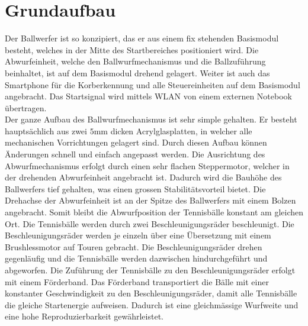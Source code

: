 \section{Grundaufbau}
    Der Ballwerfer ist so konzipiert, das er aus einem fix stehenden Basismodul besteht, 
    welches in der Mitte des Startbereiches positioniert wird. Die Abwurfeinheit, welche 
    den Ballwurfmechanismus und die Ballzuführung beinhaltet, ist auf dem Basismodul 
    drehend gelagert. Weiter ist auch das Smartphone für die Korberkennung und alle 
    Steuereinheiten auf dem Basismodul angebracht. Das Startsignal wird mittels WLAN 
    von einem externen Notebook übertragen.\\
    Der ganze Aufbau des Ballwurfmechanismus ist sehr simple gehalten. Er besteht 
    hauptsächlich aus zwei $5\si{\milli\meter}$ dicken Acrylglasplatten, in welcher alle mechanischen 
    Vorrichtungen gelagert sind. Durch diesen Aufbau können Änderungen schnell und 
    einfach angepasst werden. Die Ausrichtung des Abwurfmechanismus erfolgt durch 
    einen sehr flachen Steppermotor, welcher in der drehenden Abwurfeinheit angebracht 
    ist. Dadurch wird die Bauhöhe des Ballwerfers tief gehalten, was einen grossen 
    Stabilitätsvorteil bietet. Die Drehachse der Abwurfeinheit ist an der Spitze des 
    Ballwerfers mit einem Bolzen angebracht. Somit bleibt die Abwurfposition der 
    Tennisbälle konstant am gleichen Ort. Die Tennisbälle werden durch zwei 
    Beschleunigungsräder beschleunigt. Die Beschleunigungsräder werden je einzeln 
    über eine Übersetzung mit einem Brushlessmotor auf Touren gebracht. Die Beschleunigungsräder 
    drehen gegenläufig und die Tennisbälle werden dazwischen hindurchgeführt und 
    abgeworfen. Die Zuführung der Tennisbälle zu den Beschleunigungsräder erfolgt mit 
    einem Förderband. Das Förderband transportiert die Bälle mit einer 
    konstanter Geschwindigkeit zu den Beschleunigungsräder, damit alle Tennisbälle die 
    gleiche Startenergie aufweisen. Dadurch ist eine gleichmässige Wurfweite und eine 
    hohe Reproduzierbarkeit gewährleistet.
    
    
